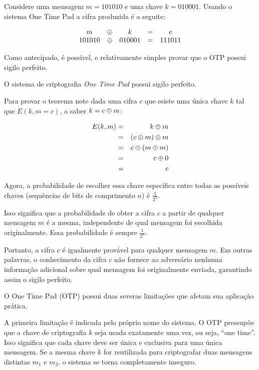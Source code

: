 \begin{example}
  Considere uma mensagem $m = 101010$ e uma chave $k = 010001$.
Usando o sistema One Time Pad a cifra produzida é a seguite:

\begin{displaymath}
  \begin{array}{ccccc}
    m & \oplus & k & = & c \\
    101010 & \oplus & 010001 & = & 111011
  \end{array}
\end{displaymath}
\end{example}




Como antecipado, é possível, e relativamente simples provar que o OTP possui sigilo perfeito.

\begin{theorem}
  O sistema de criptografia {\em One Time Pad} possui sigilo perfeito.
\end{theorem}

Para provar o teorema note dada uma cifra $c$ que esiste uma única chave $k$ tal que $E(k,m = c)$, a saber $k = c \oplus m$:

  \begin{eqnarray*}
    E(k, m) & = & k \oplus m \\
            & = & (c \oplus m) \oplus m\\
            & = & c \oplus (m \oplus m)\\
            & = & c \oplus 0\\
            & = & c
  \end{eqnarray*}

Agora, a probabilidade de escolher essa chave específica entre todas as possíveis chaves (sequências de bits de comprimento $n$) é $\frac{1}{2^n}$.

Isso significa que a probabilidade de obter a cifra $c$ a partir de qualquer mensagem $m$ é a mesma, independente de qual mensagem foi escolhida originalmente.
Essa probabilidade é sempre $\frac{1}{2^n}$.

Portanto, a cifra $c$ é igualmente provável para qualquer mensagem $m$.
Em outras palavras, o conhecimento da cifra $c$ não fornece ao adversário nenhuma informação adicional sobre qual mensagem foi originalmente enviada, garantindo assim o sigilo perfeito.

O One Time Pad (OTP) possui duas severas limitações que afetam sua aplicação prática.

A primeira limitação é indicada pelo próprio nome do sistema.
O OTP pressupõe que a chave de criptografia $k$ seja usada exatamente uma vez, ou seja, ``one time''.
Isso significa que cada chave deve ser única e exclusiva para uma única mensagem.
Se a mesma chave $k$ for reutilizada para criptografar duas mensagens distintas $m_1$ e $m_2$, o sistema se torna completamente inseguro.


